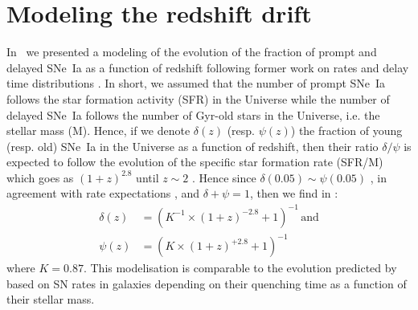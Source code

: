 \documentclass[]{aa} %
\newcommand{\mri}[1]{{\textcolor{red}{#1}}}
\newcommand{\nn}[1]{{\textcolor[rgb]{1, 0.27, 0}{#1}}}
\begin{document}






\section{Modeling the redshift drift}
\label{sec:modeling}

In~\cite{rigault2018} we presented a modeling of the evolution of the fraction
of prompt and delayed SNe~Ia as a function of redshift following former work on
rates and delay time distributions \citep[e.g.,][]{mannucci2005,
scannapieco2005, sullivan2006, aubourg2008, childress2014, maozmannucci2014}.
In short, we assumed that the number of prompt SNe~Ia follows the star formation
activity \nn{(SFR)} in the Universe while the number of delayed SNe~Ia follows
the number of Gyr-old stars in the Universe, i.e. the stellar mass \nn{(M)}.
Hence, if we denote $\delta(z)$ (resp. $\psi(z)$) the fraction of young (resp.
old) SNe~Ia in the Universe as a function of redshift, then their ratio
$\delta/\psi$ is expected to follow the evolution of the specific star formation
rate \nn{(SFR/M)} which goes as $(1+z)^{2.8}$ until $z\sim2$
\citep[e.g.,][]{tasca2015}. Hence since \nn{$\delta(0.05) \sim \psi(0.05)$}
\citep{rigault2013,rigault2018,wiseman2020}, in agreement with rate expectations
\citep{mannucci2006,rodney2014}, \nn{and $\delta + \psi = 1$,} then we find in
\cite{rigault2018}:
\begin{align}
    \label{eq:delta}
    \delta(z) & = \left( K^{-1} \times (1+z)^{-2.8} +1 \right)^{-1}\,
    \mathrm{and}\\
    \psi(z) & = \left( K \times (1+z)^{+2.8} +1 \right)^{-1}
\end{align}
where $K=0.87$. This modelisation is comparable to the evolution predicted by
\cite{childress2014} based on SN rates in galaxies depending on their quenching
time as a function of their stellar mass.
\end{document}
